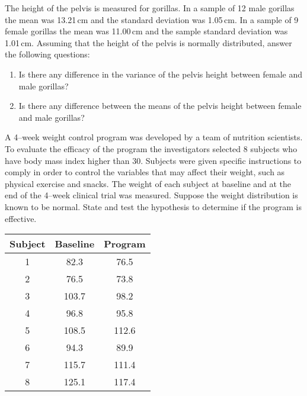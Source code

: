 \begin{problem}
 The height of the pelvis is measured for gorillas. In a sample of 12
 male gorillas the mean was 13.21\,cm and the standard deviation was
 1.05\,cm. In a sample of 9 female gorillas the mean was 11.00\,cm and
 the sample standard deviation was 1.01\,cm.
Assuming that the height of the pelvis is normally distributed, answer the following questions: 
 \begin{enumerate}
 \item   Is there any difference in the variance of the pelvis height between female and male gorillas? 
 \item Is there any difference between the means of the pelvis height between female and male gorillas?
 \end{enumerate}
\end{problem}

\begin{problem} %

\begin{multicols}{2}     
 A 4--week weight control program was developed by a team of nutrition
scientists. To evaluate the efficacy of the program the
investigators selected 8 subjects who have body mass index higher
than 30. Subjects were given specific instructions to comply in
order to control the variables that may affect their weight, such as
physical exercise and snacks. The weight of each subject at baseline
and at the end of the 4--week clinical trial was measured. Suppose the
weight distribution is known to be normal. State and test the
hypothesis to determine if the program is
effective. 

\hfill       \begin{tabular}[b]{|c|c|c|}
\hline  Subject & Baseline & Program \\ \hline
1 & 82.3 & 76.5 \\
2 & 76.5 & 73.8 \\
3 &  103.7 & 98.2 \\
4 & 96.8 & 95.8  \\
5 & 108.5 & 112.6  \\
6 & 94.3 & 89.9 \\
7 &115.7 & 111.4 \\
8 & 125.1 &  117.4 \\ \hline 
\end{tabular} \hfill \hfill
\end{multicols}


\end{problem}

